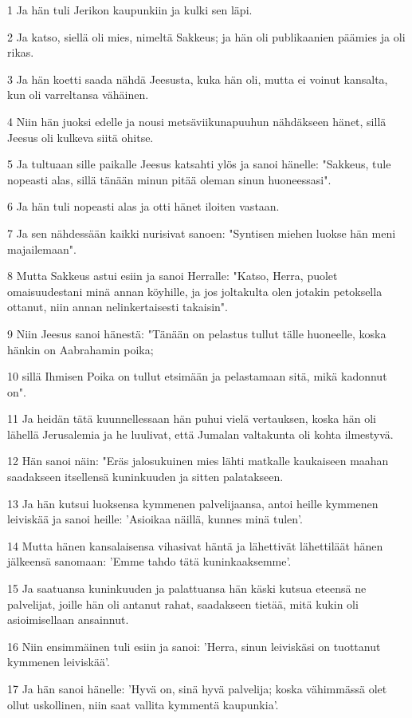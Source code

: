 \par 1 Ja hän tuli Jerikon kaupunkiin ja kulki sen läpi.
\par 2 Ja katso, siellä oli mies, nimeltä Sakkeus; ja hän oli publikaanien päämies ja oli rikas.
\par 3 Ja hän koetti saada nähdä Jeesusta, kuka hän oli, mutta ei voinut kansalta, kun oli varreltansa vähäinen.
\par 4 Niin hän juoksi edelle ja nousi metsäviikunapuuhun nähdäkseen hänet, sillä Jeesus oli kulkeva siitä ohitse.
\par 5 Ja tultuaan sille paikalle Jeesus katsahti ylös ja sanoi hänelle: "Sakkeus, tule nopeasti alas, sillä tänään minun pitää oleman sinun huoneessasi".
\par 6 Ja hän tuli nopeasti alas ja otti hänet iloiten vastaan.
\par 7 Ja sen nähdessään kaikki nurisivat sanoen: "Syntisen miehen luokse hän meni majailemaan".
\par 8 Mutta Sakkeus astui esiin ja sanoi Herralle: "Katso, Herra, puolet omaisuudestani minä annan köyhille, ja jos joltakulta olen jotakin petoksella ottanut, niin annan nelinkertaisesti takaisin".
\par 9 Niin Jeesus sanoi hänestä: "Tänään on pelastus tullut tälle huoneelle, koska hänkin on Aabrahamin poika;
\par 10 sillä Ihmisen Poika on tullut etsimään ja pelastamaan sitä, mikä kadonnut on".
\par 11 Ja heidän tätä kuunnellessaan hän puhui vielä vertauksen, koska hän oli lähellä Jerusalemia ja he luulivat, että Jumalan valtakunta oli kohta ilmestyvä.
\par 12 Hän sanoi näin: "Eräs jalosukuinen mies lähti matkalle kaukaiseen maahan saadakseen itsellensä kuninkuuden ja sitten palatakseen.
\par 13 Ja hän kutsui luoksensa kymmenen palvelijaansa, antoi heille kymmenen leiviskää ja sanoi heille: 'Asioikaa näillä, kunnes minä tulen'.
\par 14 Mutta hänen kansalaisensa vihasivat häntä ja lähettivät lähettiläät hänen jälkeensä sanomaan: 'Emme tahdo tätä kuninkaaksemme'.
\par 15 Ja saatuansa kuninkuuden ja palattuansa hän käski kutsua eteensä ne palvelijat, joille hän oli antanut rahat, saadakseen tietää, mitä kukin oli asioimisellaan ansainnut.
\par 16 Niin ensimmäinen tuli esiin ja sanoi: 'Herra, sinun leiviskäsi on tuottanut kymmenen leiviskää'.
\par 17 Ja hän sanoi hänelle: 'Hyvä on, sinä hyvä palvelija; koska vähimmässä olet ollut uskollinen, niin saat vallita kymmentä kaupunkia'.
